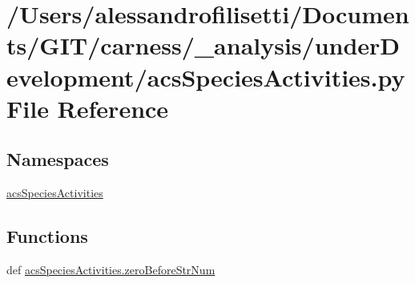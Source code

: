 \hypertarget{a00046}{\section{/\-Users/alessandrofilisetti/\-Documents/\-G\-I\-T/carness/\-\_\-analysis/under\-Development/acs\-Species\-Activities.py File Reference}
\label{a00046}
}
\subsection*{Namespaces}
\begin{DoxyCompactItemize}
\item 
\hyperlink{a00103}{acs\-Species\-Activities}
\end{DoxyCompactItemize}
\subsection*{Functions}
\begin{DoxyCompactItemize}
\item 
def \hyperlink{a00103_ac217c91fe2eee20671291adb12bbbbb2}{acs\-Species\-Activities.\-zero\-Before\-Str\-Num}
\end{DoxyCompactItemize}
